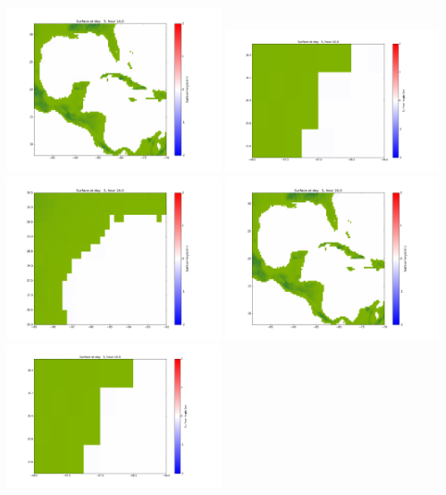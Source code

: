 \documentclass[11pt]{article}
\begin{document}
\vskip 10pt 
\includegraphics[width=0.475\textwidth]{frame0091fig1003.png}
\vskip 10pt 
\includegraphics[width=0.475\textwidth]{frame0092fig1001.png}
\includegraphics[width=0.475\textwidth]{frame0092fig1002.png}
\vskip 10pt 
\includegraphics[width=0.475\textwidth]{frame0092fig1003.png}
\vskip 10pt 
\includegraphics[width=0.475\textwidth]{frame0093fig1001.png}
\end{document}
